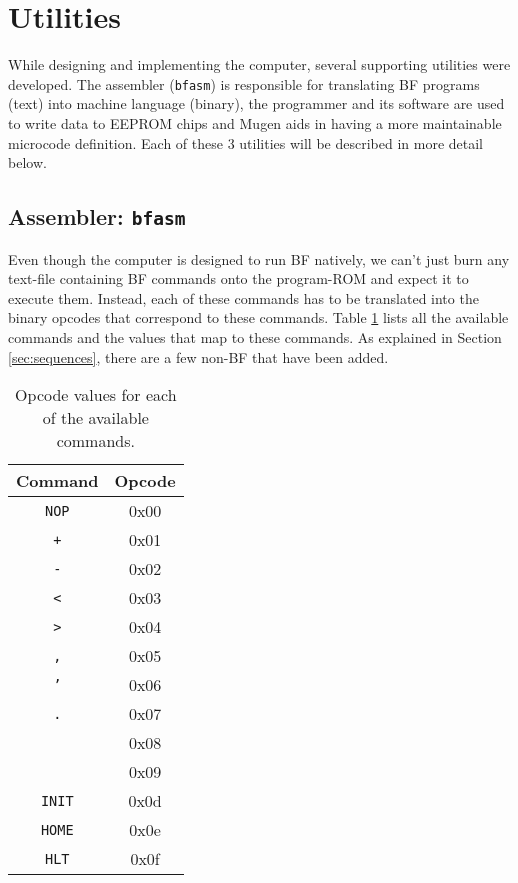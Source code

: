 \section{Utilities}
While designing and implementing the computer, several supporting utilities were developed. The assembler (\texttt{bfasm}) is responsible for translating BF programs (text) into machine language (binary), the programmer and its software are used to write data to EEPROM chips and Mugen aids in having a more maintainable microcode definition. Each of these 3 utilities will be described in more detail below.

\subsection{Assembler: \texttt{bfasm}}
Even though the computer is designed to run BF natively, we can't just burn any text-file containing BF commands onto the program-ROM and expect it to execute them. Instead, each of these commands has to be translated into the binary opcodes that correspond to these commands. Table \ref{tab:opcodes} lists all the available commands and the values that map to these commands. As explained in Section \ref{sec:sequences}, there are a few non-BF that have been added.

\begin{table}[H]
  \centering
  \begin{tabular}{c|c}
    Command & Opcode \\ \hline
    \texttt{NOP} & 0x00 \\
    \texttt{+} & 0x01 \\
    \texttt{-} & 0x02 \\
    \texttt{<} & 0x03 \\
    \texttt{>} & 0x04 \\
    \texttt{,} & 0x05 \\
    \texttt{'} & 0x06 \\
    \texttt{.} & 0x07 \\
    \texttt{\detokenize{[}} & 0x08 \\
    \texttt{\detokenize{]}} & 0x09 \\
    \texttt{INIT} & 0x0d \\
    \texttt{HOME} & 0x0e \\
    \texttt{HLT}  & 0x0f 
  \end{tabular}
  \caption{Opcode values for each of the available commands.}
  \label{tab:opcodes}
\end{table}

